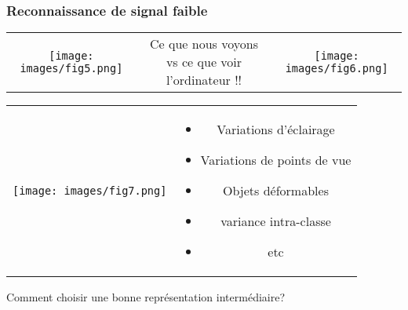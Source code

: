 \documentclass[9pt]{beamer}
\begin{document}
\begin{frame}
\frametitle{Reconnaissance de signal faible}

\begin{tabular}{ccc}

 \begin{minipage}{4cm}
\begin{center}
 \texttt{[image: images/fig5.png]}  
\end{center}
 \end{minipage}
&
\begin{minipage}{3cm}
Ce que nous voyons vs ce que voir l'ordinateur !! 
\end{minipage}
 &
 \begin{minipage}{4cm}
\begin{center}
 \texttt{[image: images/fig6.png]}  
\end{center}
 \end{minipage}
\end{tabular}

\begin{tabular}{cc}
 \begin{minipage}{6cm}

 \texttt{[image: images/fig7.png]}  

 \end{minipage}
 
&

\begin{minipage}{5cm}
\begin{itemize}
\item Variations d'éclairage 
\item Variations de points de vue 
\item Objets déformables
\item  variance intra-classe
\item etc
\end{itemize}
\end{minipage}
\end{tabular}
\begin{alertblock}{}
\begin{center}
Comment choisir une bonne représentation intermédiaire? 
\end{center}
\end{alertblock}
\end{frame}
\end{document}

